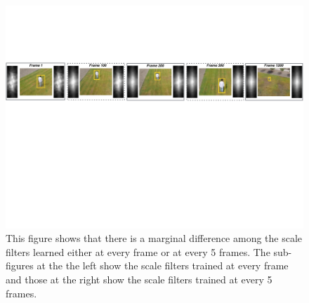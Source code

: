 \documentclass[10pt,twocolumn,letterpaper]{article}
\begin{document}

\begin{figure}[!h]
\centering
\includegraphics[width=1\textwidth]{./figures/LearnedFiltersComparison2.pdf}
\caption{This figure shows that there is a marginal difference among
  the scale filters learned either at every frame or at every 5
  frames. The sub-figures at the the left show the scale filters
  trained at every frame and those at the right show the scale filters
  trained at every 5 frames.}
\label{fig:Filters_Comparison}
\end{figure}
\end{document}
